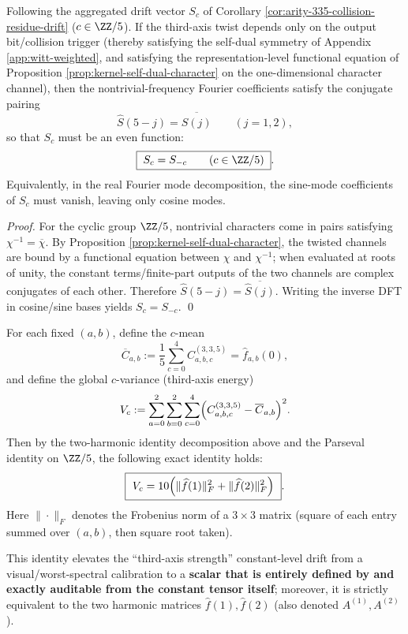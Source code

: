 \begin{corollary}\label{cor:arity-335-cosine-only}
Following the aggregated drift vector \(S_c\) of Corollary \ref{cor:arity-335-collision-residue-drift} (\(c\in\ZZ/5\)).
If the third-axis twist depends only on the output bit/collision trigger (thereby satisfying the self-dual symmetry of Appendix \ref{app:witt-weighted}, and satisfying the representation-level functional equation of Proposition \ref{prop:kernel-self-dual-character} on the one-dimensional character channel), then the nontrivial-frequency Fourier coefficients satisfy the conjugate pairing
\[
\widehat S(5-j)=\overline{\widehat S(j)}\qquad(j=1,2),
\]
so that \(S_c\) must be an even function:
\[
\boxed{\;
S_c=S_{-c}\qquad(c\in\ZZ/5)\; }.
\]
Equivalently, in the real Fourier mode decomposition, the sine-mode coefficients of \(S_c\) must vanish, leaving only cosine modes.
\end{corollary}
\begin{proof}
For the cyclic group \(\ZZ/5\), nontrivial characters come in pairs satisfying \(\chi^{-1}=\overline{\chi}\).
By Proposition \ref{prop:kernel-self-dual-character}, the twisted channels are bound by a functional equation between \(\chi\) and \(\chi^{-1}\); when evaluated at roots of unity, the constant terms/finite-part outputs of the two channels are complex conjugates of each other.
Therefore \(\widehat S(5-j)=\overline{\widehat S(j)}\). Writing the inverse DFT in cosine/sine bases yields \(S_c=S_{-c}\). \qed
\end{proof}

\begin{remark}\label{thm:arity-335-c-variance-identity}
For each fixed \((a,b)\), define the \(c\)-mean
\[
\overline C_{a,b}:=\frac{1}{5}\sum_{c=0}^{4}C^{(3,3,5)}_{a,b,c}
=\widehat f_{a,b}(0),
\]
and define the global \(c\)-variance (third-axis energy)
\[
V_c:=\sum_{a=0}^{2}\sum_{b=0}^{2}\sum_{c=0}^{4}\Bigl(C^{(3,3,5)}_{a,b,c}-\overline C_{a,b}\Bigr)^2.
\]
Then by the two-harmonic identity decomposition above and the Parseval identity on \(\ZZ/5\), the following exact identity holds:
\[
\boxed{\
V_c
=10\Bigl(\|\widehat f(1)\|_F^2+\|\widehat f(2)\|_F^2\Bigr)
\ }.
\]
Here \(\|\cdot\|_F\) denotes the Frobenius norm of a \(3\times 3\) matrix (square of each entry summed over \((a,b)\), then square root taken).
\par
This identity elevates the ``third-axis strength'' constant-level drift from a visual/worst-spectral calibration to a \textbf{scalar that is entirely defined by and exactly auditable from the constant tensor itself}; moreover, it is strictly equivalent to the two harmonic matrices \(\widehat f(1),\widehat f(2)\) (also denoted \(A^{(1)},A^{(2)}\)).
\end{remark}

